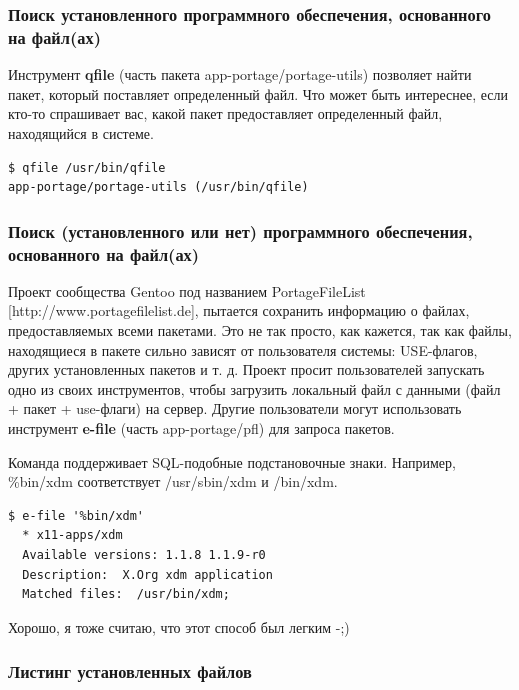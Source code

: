 \documentclass[10pt]{book}
\begin{document}
\subsubsection{Поиск установленного программного обеспечения, основанного на файл(ах)}

Инструмент \textbf{qfile} (часть пакета app-portage/portage-utils) позволяет найти пакет, который поставляет определенный файл. Что может быть интереснее, если кто-то спрашивает вас, какой пакет предоставляет определенный файл, находящийся в системе.

\begin{tcolorbox}
\begin{lstlisting}
$ qfile /usr/bin/qfile
app-portage/portage-utils (/usr/bin/qfile)
\end{lstlisting}
\end{tcolorbox}

\subsubsection{Поиск (установленного или нет) программного обеспечения, основанного на файл(ах)}

Проект сообщества Gentoo под названием PortageFileList [http://www.portagefilelist.de], пытается сохранить информацию о файлах, предоставляемых всеми пакетами. Это не так просто, как кажется, так как  файлы, находящиеся  в пакете сильно зависят от пользователя системы: USE-флагов, других установленных пакетов и т. д. Проект просит пользователей запускать одно из своих инструментов, чтобы загрузить локальный файл с данными  (файл + пакет + use-флаги) на сервер. Другие пользователи могут использовать инструмент \textbf{e-file} (часть  app-portage/pfl) для запроса пакетов.

Команда поддерживает SQL-подобные подстановочные знаки. Например, \%bin/xdm соответствует /usr/sbin/xdm
и /bin/xdm.

\begin{tcolorbox}
\begin{lstlisting}
$ e-file '%bin/xdm'
  * x11-apps/xdm
  Available versions: 1.1.8 1.1.9-r0
  Description:  X.Org xdm application
  Matched files:  /usr/bin/xdm;
\end{lstlisting}
\end{tcolorbox}

Хорошо, я тоже считаю, что этот способ был легким -;)

\subsubsection{Листинг установленных файлов}
\end{document}
